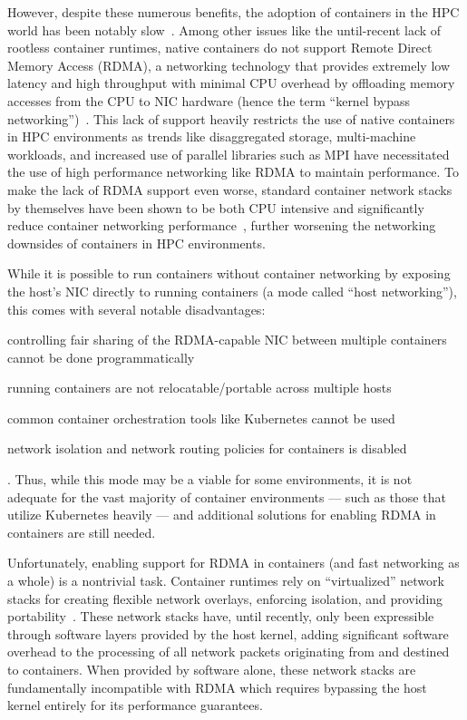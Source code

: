 \documentclass[12pt,titlepage]{article}
\begin{document}
However, despite these numerous benefits, the adoption of containers in the HPC world has been notably slow~\cite{hpcappscontainers}.
Among other issues like the until-recent lack of rootless container runtimes, native containers do not support Remote Direct Memory Access (RDMA), a networking technology that provides extremely low latency and high throughput with minimal CPU overhead by offloading memory accesses from the CPU to NIC hardware (hence the term ``kernel bypass networking'')~\cite{mellanoxrocerdmabenefits}.
This lack of support heavily restricts the use of native containers in HPC environments as trends like disaggregated storage, multi-machine workloads, and increased use of parallel libraries such as MPI have necessitated the use of high performance networking like RDMA to maintain performance.
To make the lack of RDMA support even worse, standard container network stacks by themselves have been shown to be both CPU intensive and significantly reduce container networking performance~\cite{abbasi2019performance,xavier2013performance,lee2018impact,zhao2017performance,kapovcius2020performance}, further worsening the networking downsides of containers in HPC environments.

While it is possible to run containers without container networking by exposing the host's NIC directly to running containers (a mode called ``host networking''), this comes with several notable disadvantages:
\begin{enumerate*}[label={(\arabic*)},itemjoin*={{, and }},itemjoin={{, }}]
   \item controlling fair sharing of the RDMA-capable NIC between multiple containers cannot be done programmatically
   \item running containers are not relocatable/portable across multiple hosts
   \item common container orchestration tools like Kubernetes cannot be used
   \item network isolation and network routing policies for containers is disabled
\end{enumerate*}.
Thus, while this mode may be a viable for some environments, it is not adequate for the vast majority of container environments --- such as those that utilize Kubernetes heavily --- and additional solutions for enabling RDMA in containers are still needed.

Unfortunately, enabling support for RDMA in containers (and fast networking as a whole) is a nontrivial task.
Container runtimes rely on ``virtualized'' network stacks for creating flexible network overlays, enforcing isolation, and providing portability~\cite{xavier2013performance}.
These network stacks have, until recently, only been expressible through software layers provided by the host kernel, adding significant software overhead to the processing of all network packets originating from and destined to containers.
When provided by software alone, these network stacks are fundamentally incompatible with RDMA which requires bypassing the host kernel entirely for its performance guarantees.
\end{document}
